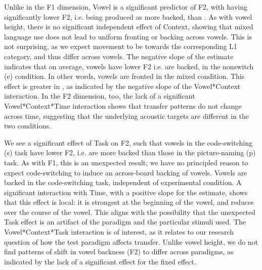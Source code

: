 Unlike in the F1 dimension, Vowel is a significant predictor of F2, with  having significantly lower F2, i.e. being produced as more backed, than \nt{\ae}. As with vowel height, there is no significant independent effect of Context, showing that mixed language use does not lead to uniform fronting or backing across vowels. This is not surprising, as we expect movement to be towards the corresponding L1 category, and thus differ across vowels. The negative slope of the estimate indicates that on average, vowels have lower F2 i.e. are backed, in the nonswitch (e) condition. In other words, vowels are fronted in the mixed condition. This effect is greater in \nt{\ae}, as indicated by the negative slope of the Vowel*Context interaction. In the F2 dimension, too, the lack of a significant Vowel*Context*Time interaction shows that transfer patterns do not change across time, suggesting that the underlying acoustic targets are different in the two conditions.

We see a significant effect of Task on F2, such that vowels in the code-switching (s) task have lower F2, i.e. are more backed than those in the picture-naming (p) task. As with F1, this is an unexpected result; we have no principled reason to expect code-switching to induce an across-board backing of vowels. Vowels are backed in the code-switching task, independent of experimental condition. A significant interaction with Time, with a positive slope for the estimate, shows that this effect is local: it is strongest at the beginning of the vowel, and reduces over the course of the vowel. This aligns with the possibility that the unexpected Task effect is an artifact of the paradigm and the particular stimuli used. The Vowel*Context*Task interaction is of interest, as it relates to our research question of how the test paradigm affects transfer. Unlike vowel height, we do not find patterns of shift in vowel backness (F2) to differ across paradigms, as indicated by the lack of a significant effect for the fixed effect. 


